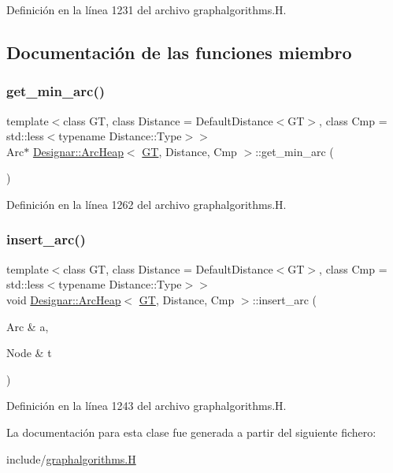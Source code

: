 Definición en la línea 1231 del archivo graphalgorithms.\+H.



\subsection{Documentación de las funciones miembro}
\mbox{\label{class_designar_1_1_arc_heap_aa97981f64e6a7868d4d8b310bfd6b1cb}} 
\subsubsection{\texorpdfstring{get\+\_\+min\+\_\+arc()}{get\_min\_arc()}}
{\footnotesize\ttfamily template$<$class GT, class Distance = Default\+Distance$<$\+G\+T$>$, class Cmp = std\+::less$<$typename Distance\+::\+Type$>$$>$ \\
Arc$\ast$ \hyperlink{class_designar_1_1_arc_heap}{Designar\+::\+Arc\+Heap}$<$ \hyperlink{demo-buildgraph_8_c_a3001c40d2c31ca87ed96cd7d1334a55e}{GT}, Distance, Cmp $>$\+::get\+\_\+min\+\_\+arc (\begin{DoxyParamCaption}{ }\end{DoxyParamCaption})\hspace{0.3cm}{\ttfamily [inline]}}



Definición en la línea 1262 del archivo graphalgorithms.\+H.

\mbox{\label{class_designar_1_1_arc_heap_a578a5310c000e671cb967799317f534d}} 
\subsubsection{\texorpdfstring{insert\+\_\+arc()}{insert\_arc()}}
{\footnotesize\ttfamily template$<$class GT, class Distance = Default\+Distance$<$\+G\+T$>$, class Cmp = std\+::less$<$typename Distance\+::\+Type$>$$>$ \\
void \hyperlink{class_designar_1_1_arc_heap}{Designar\+::\+Arc\+Heap}$<$ \hyperlink{demo-buildgraph_8_c_a3001c40d2c31ca87ed96cd7d1334a55e}{GT}, Distance, Cmp $>$\+::insert\+\_\+arc (\begin{DoxyParamCaption}\item[{Arc \&}]{a,  }\item[{Node \&}]{t }\end{DoxyParamCaption})\hspace{0.3cm}{\ttfamily [inline]}}



Definición en la línea 1243 del archivo graphalgorithms.\+H.



La documentación para esta clase fue generada a partir del siguiente fichero\+:\begin{DoxyCompactItemize}
\item 
include/\hyperlink{graphalgorithms_8_h}{graphalgorithms.\+H}\end{DoxyCompactItemize}
